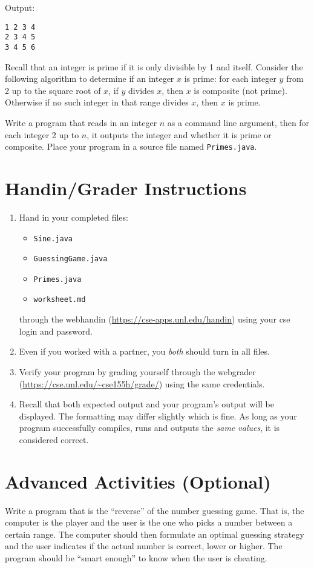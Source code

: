 \documentclass[12pt]{scrartcl}
\begin{document}
Output:

\begin{verbatim}
1 2 3 4
2 3 4 5
3 4 5 6
\end{verbatim}

Recall that an integer is prime if it is only divisible by 1 and itself.  
Consider the following algorithm to determine if an integer $x$ is 
prime: for each integer $y$ from 2 up to the square root of $x$, if $y$ 
divides $x$, then $x$ is composite (not prime).  Otherwise if no such 
integer in that range divides $x$, then $x$ is prime.  

Write a program that reads in an integer $n$ as a command line 
argument, then for each integer 2 up to $n$, it outputs the integer 
and whether it is prime or composite.  Place your program in a 
source file named \texttt{Primes.java}.

\section{Handin/Grader Instructions}

\begin{enumerate}
  \item Hand in your completed files:
    \begin{itemize}
    \item \texttt{Sine.java}
    \item \texttt{GuessingGame.java}
    \item \texttt{Primes.java}
    \item \texttt{worksheet.md}
  \end{itemize}
  through the webhandin (\url{https://cse-apps.unl.edu/handin}) 
  using your cse login and password.  
  \item Even if you worked with a partner, you \emph{both} should
  turn in all files.
  \item Verify your program by grading yourself through the
  webgrader (\url{https://cse.unl.edu/~cse155h/grade/}) using the
  same credentials.
  \item Recall that both expected output and your program's output
  will be displayed.  The formatting may differ slightly which is fine.
  As long as your program successfully compiles, runs and outputs 
  the \emph{same values}, it is considered correct.
\end{enumerate}


\section{Advanced Activities (Optional)}

Write a program that is the ``reverse'' of the number guessing game.
That is, the computer is the player and the user is the one who
picks a number between a certain range.  The computer should
then formulate an optimal guessing strategy and the user indicates
if the actual number is correct, lower or higher.  The program
should be ``smart enough'' to know when the user is cheating.
\end{document}
